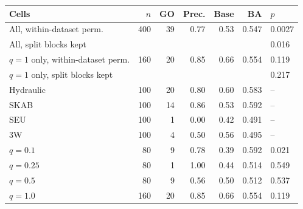 \begin{tabular}{@{}l rrrrrl@{}}
\toprule
Cells & $n$ & GO & Prec. & Base & BA & $p$ \\
\midrule
All, within-dataset perm. & 400 & 39 & 0.77 & 0.53 & 0.547 & 0.0027 \\
All, split blocks kept & & & & & & 0.016 \\
$q=1$ only, within-dataset perm. & 160 & 20 & 0.85 & 0.66 & 0.554 & 0.119 \\
$q=1$ only, split blocks kept & & & & & & 0.217 \\
\midrule
Hydraulic & 100 & 20 & 0.80 & 0.60 & 0.583 & -- \\
SKAB & 100 & 14 & 0.86 & 0.53 & 0.592 & -- \\
SEU & 100 & 1 & 0.00 & 0.42 & 0.491 & -- \\
3W & 100 & 4 & 0.50 & 0.56 & 0.495 & -- \\
\midrule
$q=0.1$ & 80 & 9 & 0.78 & 0.39 & 0.592 & 0.021 \\
$q=0.25$ & 80 & 1 & 1.00 & 0.44 & 0.514 & 0.549 \\
$q=0.5$ & 80 & 9 & 0.56 & 0.50 & 0.512 & 0.537 \\
$q=1.0$ & 160 & 20 & 0.85 & 0.66 & 0.554 & 0.119 \\
\bottomrule
\end{tabular}
